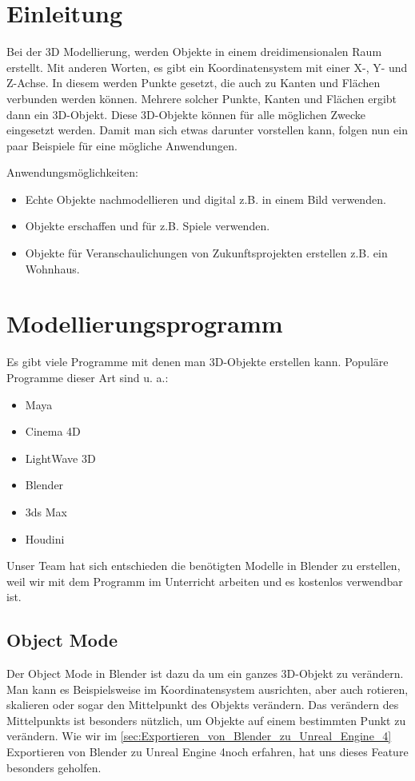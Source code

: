 \section{Einleitung}
Bei der 3D Modellierung, werden Objekte in einem dreidimensionalen Raum erstellt. Mit anderen Worten, es gibt ein Koordinatensystem mit einer X-, Y- und Z-Achse.
In diesem werden Punkte gesetzt, die auch zu Kanten und Flächen verbunden werden können. Mehrere solcher Punkte, Kanten und Flächen ergibt dann ein 3D-Objekt.
Diese 3D-Objekte können für alle möglichen Zwecke eingesetzt werden. Damit man sich etwas darunter vorstellen kann, folgen nun ein paar Beispiele für
eine mögliche Anwendungen.

Anwendungsmöglichkeiten:
\begin{itemize}
    \item Echte Objekte nachmodellieren und digital z.B. in einem Bild verwenden.
    \item Objekte erschaffen und für z.B. Spiele verwenden.
    \item Objekte für Veranschaulichungen von Zukunftsprojekten erstellen z.B. ein Wohnhaus.
\end{itemize}

\section{Modellierungsprogramm}
Es gibt viele Programme mit denen man 3D-Objekte erstellen kann.
\citep{wiki:modellierungsprogramm_beispiele}  Populäre Programme dieser Art sind u. a.:

\begin{itemize}
    \item Maya
    \item Cinema 4D
    \item LightWave 3D
    \item Blender
    \item 3ds Max
    \item Houdini
\end{itemize}

Unser Team hat sich entschieden die benötigten Modelle in Blender zu erstellen, weil wir mit dem Programm im Unterricht arbeiten und
es kostenlos verwendbar ist.


\subsection{Object Mode}
Der Object Mode in Blender ist dazu da um ein ganzes 3D-Objekt zu verändern. Man kann es Beispielsweise im Koordinatensystem ausrichten, aber
auch rotieren, skalieren oder sogar den Mittelpunkt des Objekts verändern. Das verändern des Mittelpunkts ist besonders nützlich, um Objekte auf
einem bestimmten Punkt zu verändern. Wie wir im \autoref{sec:Exportieren_von_Blender_zu_Unreal_Engine_4} \dq  Exportieren von Blender zu Unreal Engine 4\dq noch erfahren, hat uns dieses Feature besonders geholfen.

